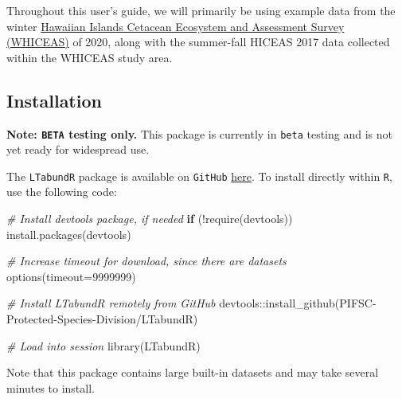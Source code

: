 \documentclass[
]{book}
\newenvironment{Shaded}{\begin{snugshade}}{\end{snugshade}}
\newcommand{\AttributeTok}[1]{\textcolor[rgb]{0.77,0.63,0.00}{#1}}
\newcommand{\CommentTok}[1]{\textcolor[rgb]{0.56,0.35,0.01}{\textit{#1}}}
\newcommand{\ControlFlowTok}[1]{\textcolor[rgb]{0.13,0.29,0.53}{\textbf{#1}}}
\newcommand{\DecValTok}[1]{\textcolor[rgb]{0.00,0.00,0.81}{#1}}
\newcommand{\FunctionTok}[1]{\textcolor[rgb]{0.00,0.00,0.00}{#1}}
\newcommand{\NormalTok}[1]{#1}
\newcommand{\SpecialCharTok}[1]{\textcolor[rgb]{0.00,0.00,0.00}{#1}}
\newcommand{\StringTok}[1]{\textcolor[rgb]{0.31,0.60,0.02}{#1}}
\begin{document}
Throughout this user's guide, we will primarily be using example data from the winter \href{https://repository.library.noaa.gov/view/noaa/47788}{Hawaiian Islands Cetacean Ecosystem and Assessment Survey (WHICEAS)} of 2020, along with the summer-fall HICEAS 2017 data collected within the WHICEAS study area.

\hypertarget{installation}{%
\subsection*{Installation}\label{installation}}

\textbf{Note: \texttt{BETA} testing only.} This package is currently in \texttt{beta} testing and is not yet ready for widespread use.

The \texttt{LTabundR} package is available on \texttt{GitHub} \href{https://github.com/PIFSC-Protected-Species-Division/LTabundR}{here}. To install directly within \texttt{R}, use the following code:

\begin{Shaded}
\begin{Highlighting}[]
\CommentTok{\# Install \textquotesingle{}devtools\textquotesingle{} package, if needed}
\ControlFlowTok{if}\NormalTok{ (}\SpecialCharTok{!}\FunctionTok{require}\NormalTok{(}\StringTok{\textquotesingle{}devtools\textquotesingle{}}\NormalTok{)) }\FunctionTok{install.packages}\NormalTok{(}\StringTok{\textquotesingle{}devtools\textquotesingle{}}\NormalTok{)}

\CommentTok{\# Increase timeout for download, since there are datasets}
\FunctionTok{options}\NormalTok{(}\AttributeTok{timeout=}\DecValTok{9999999}\NormalTok{)}

\CommentTok{\# Install LTabundR remotely from GitHub}
\NormalTok{devtools}\SpecialCharTok{::}\FunctionTok{install\_github}\NormalTok{(}\StringTok{\textquotesingle{}PIFSC{-}Protected{-}Species{-}Division/LTabundR\textquotesingle{}}\NormalTok{)}
\end{Highlighting}
\end{Shaded}

\begin{Shaded}
\begin{Highlighting}[]
\CommentTok{\# Load into session}
\FunctionTok{library}\NormalTok{(LTabundR)}
\end{Highlighting}
\end{Shaded}

Note that this package contains large built-in datasets and may take several minutes to install.
\end{document}
